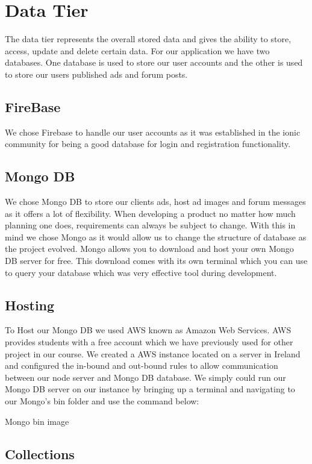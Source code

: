\section{Data Tier}

The data tier represents the overall stored data and gives the ability to store, access, update and delete certain data. For our application we have two databases. One database is used to store our user accounts and the other is used to store our users published ads and forum posts.

\subsection{FireBase}
We chose Firebase to handle our user accounts as it was established in the ionic community for being a good database for login and registration functionality.

\subsection{Mongo DB}

We chose Mongo DB to store our clients ads, host ad images and forum messages as it offers a lot of flexibility. When developing a product no matter how much planning one does, requirements can always be subject to change. With this in mind we chose Mongo as it would allow us to change the structure of database as the project evolved. Mongo allows you to download and host your own Mongo DB server for free. This download comes with its own terminal which you can use to query your database which was very effective tool during development.

\subsection{Hosting}

To Host our Mongo DB we used AWS known as Amazon Web Services. AWS provides students with a free account which we have previously used for other project in our course. We created a AWS instance located on a server in Ireland and configured the in-bound and out-bound rules to allow communication between our node server and Mongo DB database. We simply could run our Mongo DB server on our instance by bringing up a terminal and navigating to our Mongo’s bin folder and use the command below:

Mongo bin image 

\subsection{Collections}


